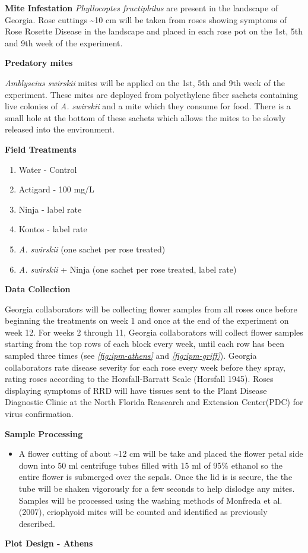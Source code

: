 \documentclass[12pt,final,CPage]{ufthesis}
\begin{document}
{  \textbf{Mite Infestation}
  \emph{Phyllocoptes fructiphilus} are present in the landscape of Georgia. Rose cuttings \textasciitilde10 cm will be taken from roses showing symptoms of Rose Rosette Disease in the landscape and placed in each rose pot on the 1st, 5th and 9th week of the experiment.

  \textbf{Predatory mites}

  \emph{Amblyseius swirskii} mites will be applied on the 1st, 5th and 9th week of the experiment. These mites are deployed from polyethylene fiber sachets containing live colonies of \emph{A. swirskii} and a mite which they consume for food. There is a small hole at the bottom of these sachets which allows the mites to be slowly released into the environment.

  \textbf{Field Treatments}
  \begin{enumerate}
  \def\labelenumi{\arabic{enumi}.}
  \tightlist
  \item
    Water - Control
  \item
    Actigard - 100 mg/L
  \item
    Ninja - label rate
  \item
    Kontos - label rate
  \item
    \emph{A. swirskii} (one sachet per rose treated)
  \item
    \emph{A. swirskii} + Ninja (one sachet per rose treated, label rate)
  \end{enumerate}
  \textbf{Data Collection}

  Georgia collaborators will be collecting flower samples from all roses once before beginning the treatments on week 1 and once at the end of the experiment on week 12. For weeks 2 through 11, Georgia collaborators will collect flower samples starting from the top rows of each block every week, until each row has been sampled three times (see \emph{\ref{fig:ipm-athens}} and \emph{\ref{fig:ipm-griff}}). Georgia collaborators rate disease severity for each rose every week before they spray, rating roses according to the Horsfall-Barratt Scale (Horsfall 1945). Roses displaying symptoms of RRD will have tissues sent to the Plant Disease Diagnostic Clinic at the North Florida Reasearch and Extension Center(PDC) for virus confirmation.

  \textbf{Sample Processing}
  \begin{itemize}
  \tightlist
  \item
    A flower cutting of about \textasciitilde12 cm will be take and placed the flower petal side down into 50 ml centrifuge tubes filled with 15 ml of 95\% ethanol so the entire flower is submerged over the sepals. Once the lid is is secure, the the tube will be shaken vigorously for a few seconds to help dislodge any mites. Samples will be processed using the washing methods of Monfreda et al. (2007), eriophyoid mites will be counted and identified as previously described.
  \end{itemize}
  \textbf{Plot Design - Athens}

}
\end{document}

